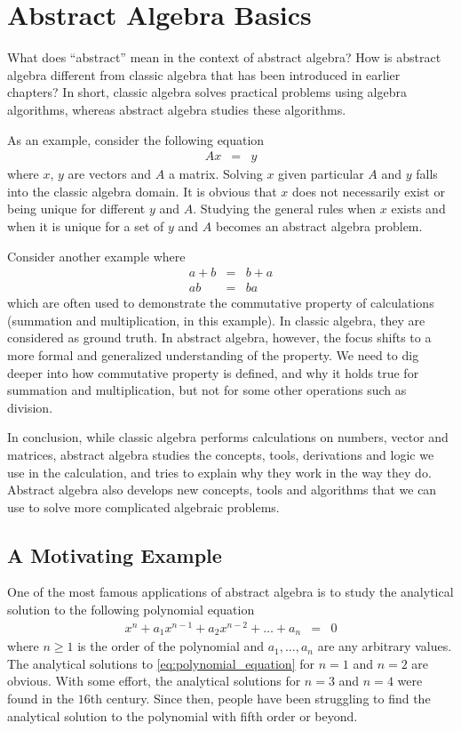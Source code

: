 \chapter{Abstract Algebra Basics}

What does ``abstract'' mean in the context of abstract algebra? How is abstract algebra different from classic algebra that has been introduced in earlier chapters? In short, classic algebra solves practical problems using algebra algorithms, whereas abstract algebra studies these algorithms.

As an example, consider the following equation
\begin{eqnarray}
  Ax &=& y \nonumber
\end{eqnarray}
where $x$, $y$ are vectors and $A$ a matrix. Solving $x$ given particular $A$ and $y$ falls into the classic algebra domain. It is obvious that $x$ does not necessarily exist or being unique for different $y$ and $A$. Studying the general rules when $x$ exists and when it is unique for a set of $y$ and $A$ becomes an abstract algebra problem.

Consider another example where
\begin{eqnarray}
 a+b &=& b+a \nonumber \\
  ab &=& ba \nonumber
\end{eqnarray}
which are often used to demonstrate the commutative property of calculations (summation and multiplication, in this example). In classic algebra, they are considered as ground truth. In abstract algebra, however, the focus shifts to a more formal and generalized understanding of the property. We need to dig deeper into how commutative property is defined, and why it holds true for summation and multiplication, but not for some other operations such as division.

In conclusion, while classic algebra performs calculations on numbers, vector and matrices, abstract algebra studies the concepts, tools, derivations and logic we use in the calculation, and tries to explain why they work in the way they do. Abstract algebra also develops new concepts, tools and algorithms that we can use to solve more complicated algebraic problems.

\section{A Motivating Example}

One of the most famous applications of abstract algebra is to study the analytical solution to the following polynomial equation
\begin{eqnarray}
  x^n + a_1x^{n-1} + a_2x^{n-2} + \ldots + a_n &=& 0 \label{eq:polynomial_equation}
\end{eqnarray}
where $n\geq 1$ is the order of the polynomial and $a_1, \ldots, a_n$ are any arbitrary values. The analytical solutions to \eqref{eq:polynomial_equation} for $n=1$ and $n=2$ are obvious. With some effort, the analytical solutions for $n=3$ and $n=4$ were found in the $16$th century. Since then, people have been struggling to find the analytical solution to the polynomial with fifth order or beyond.


